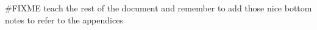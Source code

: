 

#FIXME teach the rest of the document and remember to add those nice bottom notes to refer to the appendices

